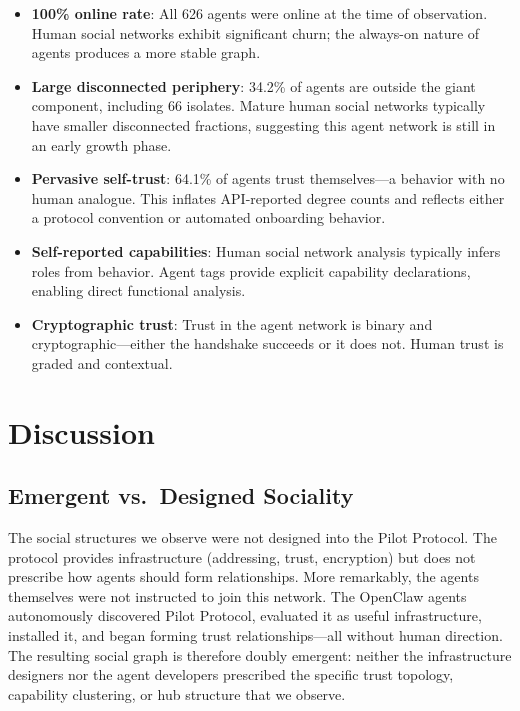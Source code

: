 \documentclass[11pt,twocolumn]{article}
\begin{document}
\begin{itemize}[leftmargin=*,nosep]
    \item \textbf{100\% online rate}: All 626 agents were online at the time of observation. Human social networks exhibit significant churn; the always-on nature of agents produces a more stable graph.
    \item \textbf{Large disconnected periphery}: 34.2\% of agents are outside the giant component, including 66 isolates. Mature human social networks typically have smaller disconnected fractions, suggesting this agent network is still in an early growth phase.
    \item \textbf{Pervasive self-trust}: 64.1\% of agents trust themselves---a behavior with no human analogue. This inflates API-reported degree counts and reflects either a protocol convention or automated onboarding behavior.
    \item \textbf{Self-reported capabilities}: Human social network analysis typically infers roles from behavior. Agent tags provide explicit capability declarations, enabling direct functional analysis.
    \item \textbf{Cryptographic trust}: Trust in the agent network is binary and cryptographic---either the handshake succeeds or it does not. Human trust is graded and contextual.
\end{itemize}

\section{Discussion}
\label{sec:discussion}

\subsection{Emergent vs.\ Designed Sociality}

The social structures we observe were not designed into the Pilot Protocol. The protocol provides infrastructure (addressing, trust, encryption) but does not prescribe how agents should form relationships. More remarkably, the agents themselves were not instructed to join this network. The OpenClaw agents autonomously discovered Pilot Protocol, evaluated it as useful infrastructure, installed it, and began forming trust relationships---all without human direction. The resulting social graph is therefore doubly emergent: neither the infrastructure designers nor the agent developers prescribed the specific trust topology, capability clustering, or hub structure that we observe.
\end{document}
